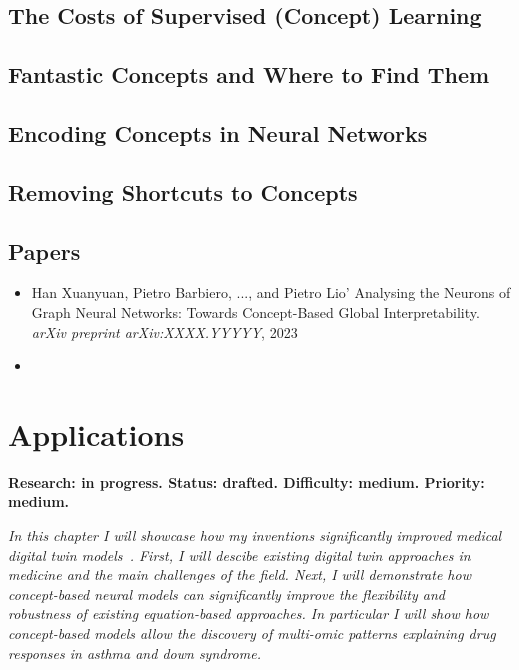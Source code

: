 \documentclass[withindex,glossary]{cam-thesis}
\begin{document}
\section{The Costs of Supervised (Concept) Learning}

\section{Fantastic Concepts and Where to Find Them}

\section{Encoding Concepts in Neural Networks}

\section{Removing Shortcuts to Concepts}

\section*{Papers}
\nobibliography*
\begin{itemize}
    \item Han Xuanyuan, Pietro Barbiero, ..., and Pietro Lio' Analysing the Neurons of Graph Neural Networks: Towards Concept-Based Global Interpretability. \textit{arXiv preprint arXiv:XXXX.YYYYY}, 2023
    \item {}
\end{itemize}



\chapter{Applications} \label{chapter:applications}
\textbf{Research: in progress. Status: drafted. Difficulty: medium. Priority: medium.}

\textit{In this chapter I will showcase how my inventions significantly improved medical digital twin models~\citep{laubenbacher2021using}. First, I will descibe existing digital twin approaches in medicine and the main challenges of the field. Next, I will demonstrate how concept-based neural models can significantly improve the flexibility and robustness of existing equation-based approaches. In particular I will show how concept-based models allow the discovery of multi-omic patterns explaining drug responses in asthma and down syndrome.}
\end{document}
